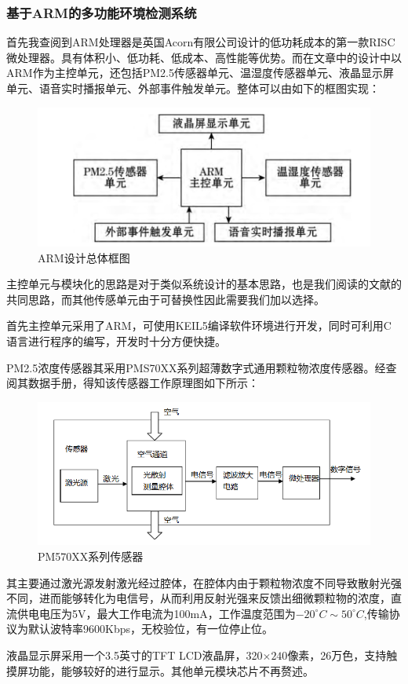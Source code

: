 \documentclass[a4paper, 11pt]{article} %
\begin{document}
\subsubsection{基于ARM的多功能环境检测系统}
\par{} 首先我查阅到ARM处理器是英国Acorn有限公司设计的低功耗成本的第一款RISC微处理器。具有体积小、低功耗、低成本、高性能等优势。而在文章\cite{qal2017jy}中的设计中以ARM作为主控单元，还包括PM2.5传感器单元、温湿度传感器单元、液晶显示屏单元、语音实时播报单元、外部事件触发单元。整体可以由如下的框图实现：
\begin{figure}[H]
  \centering
  \includegraphics[scale = 0.7 ]{1-2.png}
  \caption{ARM设计总体框图}
  \label{img2} 
\end{figure}
\par{} 主控单元与模块化的思路是对于类似系统设计的基本思路，也是我们阅读的文献的共同思路，而其他传感单元由于可替换性因此需要我们加以选择。
\par{} 首先主控单元采用了ARM，可使用KEIL5编译软件环境进行开发，同时可利用C语言进行程序的编写，开发时十分方便快捷。
\par{} PM2.5浓度传感器其采用PMS70XX系列超薄数字式通用颗粒物浓度传感器。经查阅其数据手册\cite{PMS7003}，得知该传感器工作原理图如下所示：
\begin{figure}[H]
  \centering
  \includegraphics[scale = 0.65 ]{1-3.png}
  \caption{PM570XX系列传感器}
  \label{img3} 
\end{figure}
\par{} 其主要通过激光源发射激光经过腔体，在腔体内由于颗粒物浓度不同导致散射光强不同，进而能够转化为电信号，从而利用反射光强来反馈出细微颗粒物的浓度，直流供电电压为5V，最大工作电流为100mA，工作温度范围为$-20^{\circ} C\sim 50^{\circ}C$,传输协议为默认波特率9600Kbps，无校验位，有一位停止位。
\par{} 液晶显示屏采用一个3.5英寸的TFT LCD液晶屏，320$\times 240$像素，26万色，支持触摸屏功能，能够较好的进行显示。其他单元模块芯片不再赘述。
\end{document}

